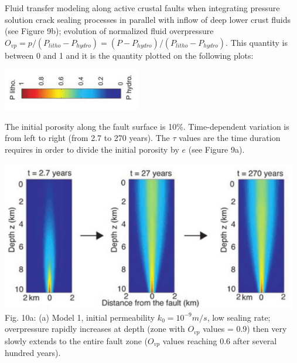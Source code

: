 Fluid transfer modeling along active crustal faults when integrating pressure solution crack sealing
processes in parallel with inflow of deep lower crust fluids (see Figure 9b); evolution of 
normalized fluid overpressure $O_{vp} = p/(P_{litho}-P_{hydro}) = (P- P_{hydro})/(P_{litho} - P_{hydro})$. 
This quantity is between 0 and 1 and it is the quantity plotted on the following plots:
\begin{center}
\includegraphics[width=6cm]{python_codes/fieldstone_126/images/grfr03_Ovp}\\
\end{center}
The initial porosity along the fault surface is 10\%. Time-dependent
variation is from left to right (from 2.7 to 270 years). The $\tau$ values are the time duration 
requires in order to divide the initial porosity by $e$ (see Figure 9a). 

\begin{center}
\includegraphics[width=13cm]{python_codes/fieldstone_126/images/grfr03_10a}\\
{\captionfont Fig. 10a:
(a) Model 1, initial permeability $k_0 = 10^{-9} m/s$, low sealing rate; 
overpressure rapidly increases at depth (zone with $O_{vp}$ values = 0.9) then very 
slowly extends to the entire fault zone ($O_{vp}$ values reaching 0.6
after several hundred years). 
}
\end{center}

